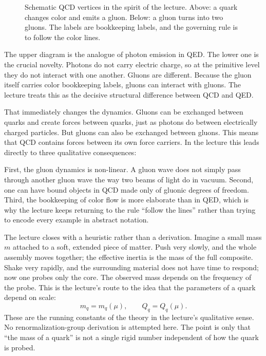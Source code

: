 \begin{figure}[t]
\centering
{}

\bigskip

\caption{Schematic QCD vertices in the spirit of the lecture. Above: a quark changes color and emits a gluon. Below: a gluon turns into two gluons. The labels are bookkeeping labels, and the governing rule is to follow the color lines.}
\end{figure}

The upper diagram is the analogue of photon emission in QED. The lower one is the crucial novelty. Photons do not carry electric charge, so at the primitive level they do not interact with one another. Gluons are different. Because the gluon itself carries color bookkeeping labels, gluons can interact with gluons. The lecture treats this as the decisive structural difference between QCD and QED.

That immediately changes the dynamics. Gluons can be exchanged between quarks and create forces between quarks, just as photons do between electrically charged particles. But gluons can also be exchanged between gluons. This means that QCD contains forces between its own force carriers. In the lecture this leads directly to three qualitative consequences:

First, the gluon dynamics is non-linear. A gluon wave does not simply pass through another gluon wave the way two beams of light do in vacuum. Second, one can have bound objects in QCD made only of gluonic degrees of freedom. Third, the bookkeeping of color flow is more elaborate than in QED, which is why the lecture keeps returning to the rule ``follow the lines'' rather than trying to encode every example in abstract notation.

The lecture closes with a heuristic rather than a derivation. Imagine a small mass \(m\) attached to a soft, extended piece of matter. Push very slowly, and the whole assembly moves together; the effective inertia is the mass of the full composite. Shake very rapidly, and the surrounding material does not have time to respond; now one probes only the core. The observed mass depends on the frequency of the probe. This is the lecture's route to the idea that the parameters of a quark depend on scale:
\begin{equation}
m_q=m_q(\mu),
\qquad
Q_q=Q_q(\mu).
\end{equation}
These are the running constants of the theory in the lecture's qualitative sense. No renormalization-group derivation is attempted here. The point is only that ``the mass of a quark'' is not a single rigid number independent of how the quark is probed.

